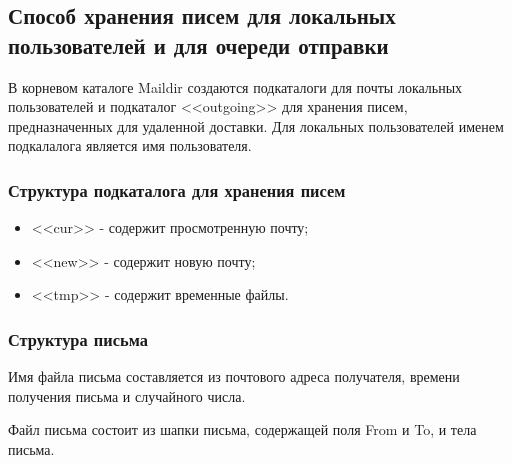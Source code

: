 \subsection{Способ хранения писем для локальных пользователей и для очереди отправки}
В корневом каталоге Maildir создаются подкаталоги для почты локальных пользователей и подкаталог <<outgoing>> для хранения писем, предназначенных для удаленной доставки.
Для локальных пользователей именем подкалалога является имя пользователя.

\subsubsection{Структура подкаталога для хранения писем}
\begin{itemize}
\item <<cur>> - содержит просмотренную почту;
\item <<new>> - содержит новую почту;
\item <<tmp>> - содержит временные файлы.
\end{itemize}

\subsubsection{Структура письма}
Имя файла письма составляется из почтового адреса получателя, времени получения письма и случайного числа.

Файл письма состоит из шапки письма, содержащей поля From и To, и тела письма. 


